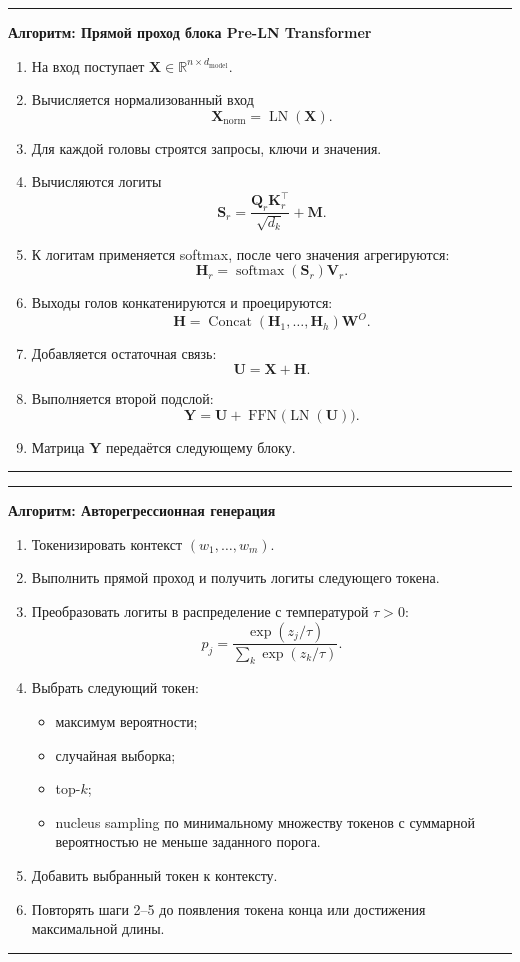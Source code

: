 \documentclass[12pt,a4paper]{article}
\theoremstyle{definition}
\newcommand{\R}{\mathbb{R}}
\newcommand{\softmax}{\operatorname{softmax}}
\newcommand{\1}{\mathbf{1}}
\newenvironment{algorithmbox}[1]
{
    \begin{center}
    \begin{minipage}{0.95\textwidth}
    \hrule
    \medskip
    \textbf{Алгоритм: #1}
    \begin{enumerate}[leftmargin=*,label=\arabic*.]
}
{
    \end{enumerate}
    \medskip
    \hrule
    \end{minipage}
    \end{center}
}
\begin{document}
\begin{algorithmbox}{Прямой проход блока Pre-LN Transformer}
    \item На вход поступает
    $\bm{X}\in\R^{n\times d_{\text{model}}}$.
    \item Вычисляется нормализованный вход
    \[
        \bm{X}_{\text{norm}}=\operatorname{LN}(\bm{X}).
    \]
    \item Для каждой головы строятся запросы, ключи и значения.
    \item Вычисляются логиты
    \[
        \bm{S}_r
        =
        \frac{\bm{Q}_r\bm{K}_r^\top}{\sqrt{d_k}}+\bm{M}.
    \]
    \item К логитам применяется softmax, после чего значения
    агрегируются:
    \[
        \bm{H}_r=\softmax(\bm{S}_r)\bm{V}_r.
    \]
    \item Выходы голов конкатенируются и проецируются:
    \[
        \bm{H}
        =
        \operatorname{Concat}(\bm{H}_1,\ldots,\bm{H}_h)\bm{W}^O.
    \]
    \item Добавляется остаточная связь:
    \[
        \bm{U}=\bm{X}+\bm{H}.
    \]
    \item Выполняется второй подслой:
    \[
        \bm{Y}
        =
        \bm{U}
        +
        \operatorname{FFN}
        \bigl(
            \operatorname{LN}(\bm{U})
        \bigr).
    \]
    \item Матрица $\bm{Y}$ передаётся следующему блоку.
\end{algorithmbox}

\begin{algorithmbox}{Авторегрессионная генерация}
    \item Токенизировать контекст
    $(w_1,\ldots,w_m)$.
    \item Выполнить прямой проход и получить логиты следующего токена.
    \item Преобразовать логиты в распределение с температурой
    $\tau>0$:
    \[
        p_j
        =
        \frac{\exp(z_j/\tau)}
             {\sum_k\exp(z_k/\tau)}.
    \]
    \item Выбрать следующий токен:
    \begin{itemize}
        \item максимум вероятности;
        \item случайная выборка;
        \item top-$k$;
        \item nucleus sampling по минимальному множеству токенов с
        суммарной вероятностью не меньше заданного порога.
    \end{itemize}
    \item Добавить выбранный токен к контексту.
    \item Повторять шаги 2--5 до появления токена конца или достижения
    максимальной длины.
\end{algorithmbox}
\end{document}
